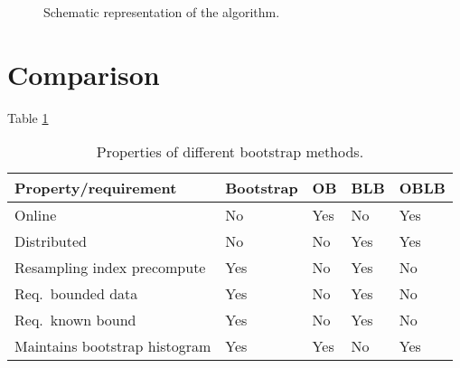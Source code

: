 \documentclass{article}
\begin{document}
\begin{sidewaysfigure}[tbp]
\caption{Schematic representation of the algorithm.}
\end{sidewaysfigure}


\section{Comparison}

Table \ref{bootcomp}

\begin{table}[h]
\caption{Properties of different bootstrap methods.}
\label{bootcomp}
\begin{tabular}{lllll}
\hline
\hline
Property/requirement & Bootstrap & OB & BLB & OBLB \\
\hline
Online & No & Yes & No & Yes \\ 
Distributed & No & No & Yes &  Yes \\ 
Resampling index precompute & Yes & No & Yes & No \\ 
Req.\ bounded data & Yes & No & Yes & No \\ 
Req.\ known bound & Yes & No & Yes & No \\ 
Maintains bootstrap histogram & Yes & Yes & No & Yes \\
\hline
\hline
\end{tabular}
\end{table}




{}

\end{document}
